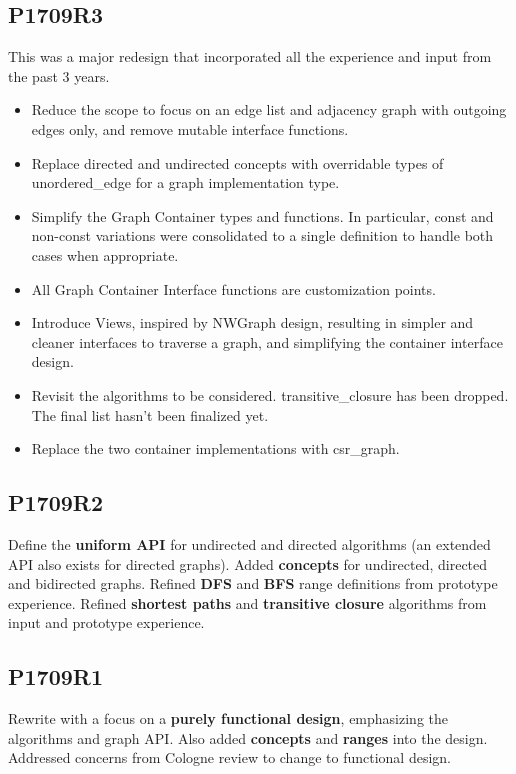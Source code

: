 \documentclass[10pt,onecolumn]{article}
\begin{document}
\subsection*{P1709R3}
This was a major redesign that incorporated all the experience and input from the past 3 years.
\begin{itemize}
\item Reduce the scope to focus on an edge list and adjacency graph with outgoing edges only, and remove mutable interface functions. 
\item Replace directed and undirected concepts with overridable types of unordered\_edge for a graph implementation type.
\item Simplify the Graph Container types and functions. In particular, const and non-const variations were consolidated to a single definition to handle both cases 
when appropriate.
\item All Graph Container Interface functions are customization points.
\item Introduce Views, inspired by NWGraph design, resulting in simpler and cleaner interfaces to traverse a graph, and simplifying the container interface design.
\item Revisit the algorithms to be considered. transitive\_closure has been dropped. The final list hasn't been finalized yet.
\item Replace the two container implementations with csr\_graph.
\end{itemize}

\subsection*{P1709R2}
Define the \textbf{uniform API} for undirected and directed algorithms (an extended API also exists for directed graphs). Added \textbf{concepts} for undirected, directed and bidirected graphs. Refined \textbf{DFS} and \textbf{BFS} range definitions from prototype experience. Refined \textbf{shortest paths} and \textbf{transitive closure} algorithms from input and prototype experience.

\subsection*{P1709R1}
Rewrite with a focus on a \textbf{purely functional design}, emphasizing the algorithms and graph API. Also added \textbf{concepts} and \textbf{ranges} into the design. Addressed concerns from Cologne review to change to functional design.
\end{document}
